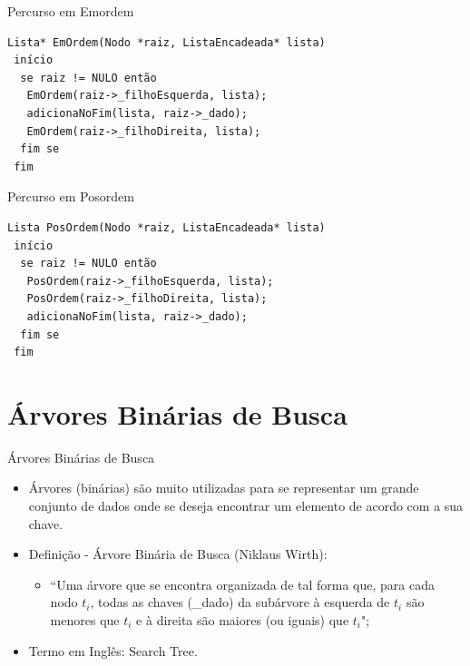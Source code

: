 \documentclass[12pt,table,xcolor={dvipsnames}]{beamer}
\begin{document}
\begin{frame}[fragile]{Percurso em Emordem}
          \begin{lstlisting}
Lista* EmOrdem(Nodo *raiz, ListaEncadeada* lista)
 início
  se raiz != NULO então
   EmOrdem(raiz->_filhoEsquerda, lista);
   adicionaNoFim(lista, raiz->_dado);
   EmOrdem(raiz->_filhoDireita, lista);
  fim se
 fim
\end{lstlisting}
\end{frame} 

\begin{frame}[fragile]{Percurso em Posordem}
          \begin{lstlisting}
Lista PosOrdem(Nodo *raiz, ListaEncadeada* lista)
 início
  se raiz != NULO então
   PosOrdem(raiz->_filhoEsquerda, lista);
   PosOrdem(raiz->_filhoDireita, lista);
   adicionaNoFim(lista, raiz->_dado);
  fim se
 fim
 \end{lstlisting}
\end{frame} 

\section{Árvores Binárias de Busca}

\begin{frame}[fragile]{Árvores Binárias de Busca}
          \begin{itemize}
          \item Árvores (binárias) são muito utilizadas para se representar um grande conjunto de dados onde se deseja encontrar um elemento de acordo com a sua chave.
          \item Definição - Árvore Binária de Busca (Niklaus Wirth):
          \begin{itemize}
          \item “Uma árvore que se encontra organizada de tal forma que, para cada nodo $t_i$, todas as chaves (\_dado) da subárvore à esquerda de $t_i$ são menores que $t_i$ e à direita são maiores (ou iguais) que $t_i$";
          \end{itemize}
          \item Termo em Inglês: Search Tree.
       	  \end{itemize}
\end{frame}
\end{document}
